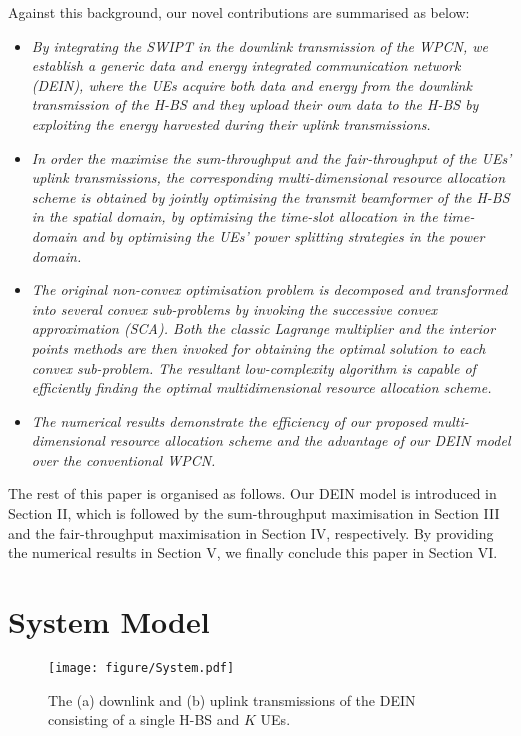 \documentclass[12pt,draft,onecolumn,journal]{IEEEtran}
\begin{document}
Against this background, our novel contributions are summarised as below:
\begin{itemize}
	\item \textit{By integrating the SWIPT in the downlink transmission of the WPCN, we establish a generic data and energy integrated communication network (DEIN), where the UEs acquire both data and energy from the downlink transmission of the H-BS and they upload their own data to the H-BS by exploiting the energy harvested during their uplink transmissions.}
	\item \textit{In order the maximise the sum-throughput and the fair-throughput of the UEs' uplink transmissions, the corresponding multi-dimensional resource allocation scheme is obtained by jointly optimising the transmit beamformer of the H-BS in the spatial domain, by optimising the time-slot allocation in the time-domain and by optimising the UEs' power splitting strategies  in the power domain.}
	\item \textit{The original non-convex optimisation problem is decomposed and transformed into several convex sub-problems by invoking the successive convex approximation (SCA). Both the classic Lagrange multiplier and the interior points methods are then invoked for obtaining the optimal solution to each convex sub-problem. The resultant low-complexity algorithm is capable of efficiently finding the optimal multidimensional resource allocation scheme.}
	\item \textit{The numerical results demonstrate the efficiency of our proposed multi-dimensional resource allocation scheme and the advantage of our DEIN model over the conventional WPCN.}
\end{itemize}

The rest of this paper is organised as follows. Our DEIN model is introduced in Section II, which is followed by the sum-throughput maximisation in Section III and the fair-throughput maximisation in Section IV, respectively. By providing the numerical results in Section V, we finally conclude this paper in Section VI.


\section{System Model}

\begin{figure}[!t]	
	\centering
	\texttt{[image: figure/System.pdf]}
	\caption{The (a) downlink and (b) uplink transmissions of the DEIN consisting of a single H-BS and $K$ UEs.}
	\label{fig:system}
\end{figure}
\end{document}
